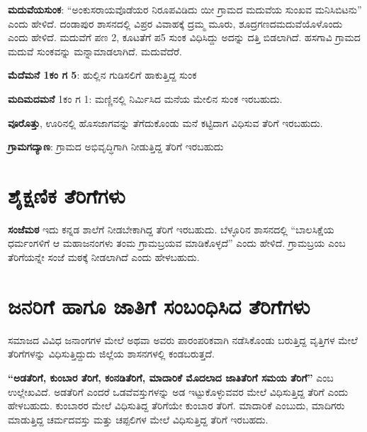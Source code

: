 \textbf{ಮದುವೆಯಸುಂಕ}: “ಅಂಕುಸರಾಯವೊಡೆಯರ ನಿರೂಪವಿಡಿದು ಯೀ ಗ್ರಾಮದ ಮದುವೆಯ ಸುಂಖವ ಮನಿಸಿಬಿಟನು” ಎಂದು ಹೇಳಿದೆ. ದಂಡಾಪುರ ಶಾಸನದಲ್ಲಿ ವಿಪ್ರರ ವಿವಾಹಕ್ಕೆ ದ್ರಮ್ಮ ಮೂರು, ಶೂದ್ರಗಣದ\break ಮದುವೆಯೊಳೊಂದು ಎಂದು ಹೇಳಿದೆ. ಮದುವೆಗೆ ಪಣ 2, ಕೂಟತೆಗೆ ಪ5 ಸುಂಕ ವಿಧಿಸಿದ್ದು ಅದನ್ನು ದತ್ತಿ ಬಿಡಲಾಗಿದೆ. ಹಸಗಾವಿ ಗ್ರಾಮದ ಮದುವೆ ಸುಂಕವನ್ನು ಮನ್ನಾಮಾಡಲಾಗಿದೆ. ಮದುವೆದೆರೆ.

\textbf{ಮೆದೆಮನೆ 1ಕಂ ಗ 5}: ಹುಲ್ಲಿನ ಗುಡಿಸಲಿಗೆ ಹಾಕುತ್ತಿದ್ದ ಸುಂಕ

\textbf{ಮದಿಮದಮನೆ} 1ಕಂ ಗ 1: ಮಣ್ಣಿನಲ್ಲಿ ನಿರ್ಮಿಸಿದ ಮನೆಯ ಮೇಲಿನ ಸುಂಕ ಇರಬಹುದು.

\textbf{ವೂರೊತ್ತು}, ಊರಿನಲ್ಲಿ ಹೊಸಜಾಗವನ್ನು ತೆಗೆದುಕೊಂಡು ಮನೆ ಕಟ್ಟಿದಾಗ ವಿಧಿಸುವ ತೆರಿಗೆ ಇರಬಹುದು.

\textbf{ಗ್ರಾಮಗದ್ಯಾಣ}: ಗ್ರಾಮದ ಅಭಿವೃದ್ಧಿಗಾಗಿ ನೀಡುತ್ತಿದ್ದ ತೆರಿಗೆ ಇರಬಹುದು

\newpage

\section{ಶೈಕ್ಷಣಿಕ ತೆರಿಗೆಗಳು}

\textbf{ಸಂಜೆಮಠ} ಇದು ಕನ್ನಡ ಶಾಲೆಗೆ ನೀಡಬೇಕಾಗಿದ್ದ ತೆರಿಗೆ ಇರಬಹುದು. ಬೆಳ್ಳೂರಿನ ಶಾಸನದಲ್ಲಿ “ಬಾಲಸಿಕ್ಷೆಯ ಧರ್ಮಂಗಳಿಗೆ ಆ ಮಹಾಜನಂಗಳು ತಂಮ ಗ್ರಾಮಬ್ರಯವ ಮಾಡಿಕೊಳ್ಳದೆ” ಎಂದು ಹೇಳಿದೆ. ಗ್ರಾಮಬ್ರಯ ಎಂಬ ತೆರಿಗೆಯನ್ನೇ ಸಂಜೆ ಮಠಕ್ಕೆ ನೀಡಲಾಗಿದೆ ಎಂದು ಹೇಳಬಹುದು.


\section{ಜನರಿಗೆ ಹಾಗೂ ಜಾತಿಗೆ ಸಂಬಂಧಿಸಿದ ತೆರಿಗೆಗಳು}

ಸಮಾಜದ ವಿವಿಧ ಜನಾಂಗಗಳ ಮೇಲೆ ಅಥವಾ ಅವರು ಪಾರಂಪರಿಕವಾಗಿ ನಡೆಸಿಕೊಂಡು ಬರುತ್ತಿದ್ದ ವೃತ್ತಿಗಳ ಮೇಲೆ ತೆರಿಗೆಗಳನ್ನು ವಿಧಿಸುತ್ತಿದ್ದುದು ಜಿಲ್ಲೆಯ ಶಾಸನಗಳಲ್ಲಿ ಕಂಡಬರುತ್ತದೆ.

\textbf{“ಅಡತೆರಿಗೆ, ಕುಂಬಾರ ತೆರಿಗೆ, ಕಂನಡಿತೆರಿಗೆ, ಮಾದಾರಿಕೆ ಮೊದಲಾದ ಜಾತಿತೆರಿಗೆ ಸಮಯ ತೆರಿಗೆ”} ಎಂಬ ಉಲ್ಲೇಖವಿದೆ.\textbf{ }ಅಡತೆರಿಗೆ ಎಂದರೆ ಒಡವೆವಸ್ತುಗಳನ್ನು ಅಡ ಇಟ್ಟುಕೊಳ್ಳುವವರ ಮೇಲೆ ವಿಧಿಸುತ್ತಿದ್ದ ತೆರಿಗೆ ಎಂದು ಹೇಳಬಹುದು. ಕುಂಬಾರರ ಮೇಲೆ ವಿಧಿಸುತಿದ್ದ ತೆರಿಗೆಯೇ ಕುಂಬಾರ ತೆರಿಗೆ. ಮಾದಾರಿಕೆ ಎಂಬುದು, ಮಾದಿಗರು ಮಾಡುತ್ತಿದ್ದ ಚರ್ಮದವಸ್ತು ಮತ್ತು ಚಪ್ಪಲಿಗಳ ಮೇಲೆ ವಿಧಿಸುತ್ತಿದ್ದ ತೆರಿಗೆ ಇರಬಹದು. 

